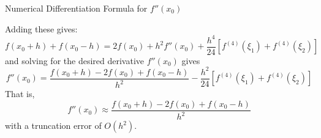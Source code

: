 \documentclass[12pt]{beamer}
\begin{document}
\begin{frame}{Numerical Differentiation Formula for $f''(x_0)$}

Adding these gives:
\begin{equation*}
f(x_0+h)+ f(x_0-h)= 2f(x_0) + h^2f''(x_0) +  \frac{h^4}{24}\left[f^{(4)}(\xi_1)+f^{(4)}(\xi_2)\right]
\end{equation*}
and solving for the desired derivative $f''(x_0)$ gives
\begin{equation*}
f''(x_0)= \frac{f(x_0+h)-2f(x_0)+f(x_0-h)}{h^2} - \frac{h^2}{24}\left[f^{(4)}(\xi_1)+f^{(4)}(\xi_2)\right]
\end{equation*}
That is, 
\begin{equation*}
f''(x_0) \approx \frac{f(x_0+h)-2f(x_0)+f(x_0-h)}{h^2}
\end{equation*}
with a truncation error of $O(h^2)$.

\end{frame}
\end{document}
